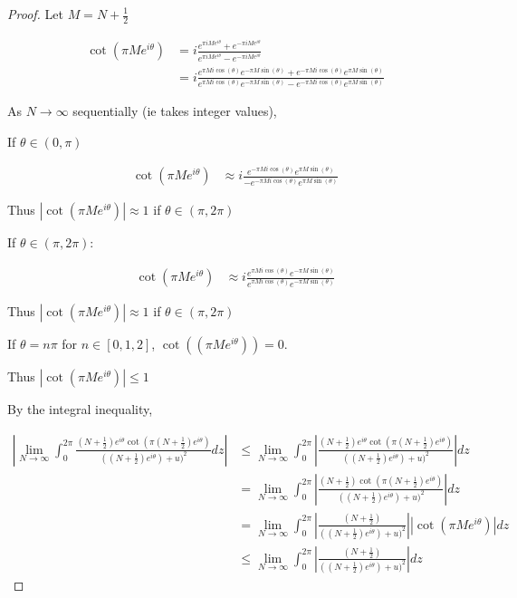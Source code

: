 \documentclass{article}
\newcommand{\abs}[1]{\left\lvert #1\right\rvert}
\begin{document}
\begin{proof}
    Let $M = N + \frac{1}{2}$ 

    \begin{align*}
        \cot\left(\pi Me^{i \theta}\right) &= i \frac{e^{\pi i M e^{i \theta}} + e^{- \pi i M e^{i \theta}}}{e^{\pi i M e^{i \theta}} - e^{- \pi i M e^{i \theta}}} \\
        &= i \frac{e^{\pi M i \cos(\theta)} e^{- \pi M \sin(\theta)} + e^{-\pi Mi \cos(\theta)} e^{\pi M \sin(\theta)}}{e^{\pi M i \cos(\theta)} e^{- \pi M \sin(\theta)} - e^{-\pi Mi \cos(\theta)} e^{\pi M \sin(\theta)}}
    \end{align*} 


    As $N \to \infty$ sequentially (ie takes integer values),
    
    If $\theta \in (0, \pi)$ 
    
    \begin{align*}
        \cot\left(\pi Me^{i \theta}\right) &\approx i \frac{e^{-\pi Mi \cos(\theta)} e^{\pi M \sin(\theta)}}{-e^{-\pi Mi \cos(\theta)} e^{\pi M \sin(\theta)}}
    \end{align*}

    Thus $\abs{\cot\left(\pi Me^{i \theta}\right)} \approx 1$ if $\theta \in (\pi, 2 \pi)$   

    If $\theta \in (\pi, 2 \pi)$:

    \begin{align*}
        \cot\left(\pi Me^{i \theta}\right) &\approx i \frac{e^{\pi Mi \cos(\theta)} e^{-\pi M \sin(\theta)}}{e^{\pi Mi \cos(\theta)} e^{-\pi M \sin(\theta)}}
    \end{align*}

    Thus $\abs{\cot\left(\pi Me^{i \theta}\right)} \approx 1$ if $\theta  \in (\pi, 2 \pi)$ 

    If $\theta = n \pi$ for $n \in [0, 1, 2]$, $\cot\left(\left(\pi Me^{i \theta}\right)\right) = 0$. 
    
    Thus $\abs{\cot\left(\pi Me^{i \theta}\right)} \leq 1$ 

    By the integral inequality,

    \begin{align*}
        \abs{\lim_{N \to \infty}  \int_{0}^{2 \pi} \frac{(N + \frac{1}{2})e^{i \theta} \cot(\pi (N + \frac{1}{2})e^{i \theta})}{((N + \frac{1}{2})e^{i \theta}) + u)^2} dz} 
        &\leq \lim_{N \to \infty} \int_{0}^{2 \pi} \abs{\frac{(N + \frac{1}{2})e^{i \theta} \cot(\pi (N + \frac{1}{2})e^{i \theta})}{((N + \frac{1}{2})e^{i \theta}) + u)^2}} dz \\
        &= \lim_{N \to \infty} \int_{0}^{2 \pi} \abs{\frac{(N + \frac{1}{2}) \cot(\pi (N + \frac{1}{2})e^{i \theta})}{((N + \frac{1}{2})e^{i \theta}) + u)^2}} dz \\
        &= \lim_{N \to \infty} \int_{0}^{2 \pi} \abs{\frac{(N + \frac{1}{2})}{((N + \frac{1}{2})e^{i \theta}) + u)^2}} \abs{\cot\left(\pi Me^{i \theta}\right)} dz \\
        &\leq \lim_{N \to \infty} \int_{0}^{2 \pi} \abs{\frac{(N + \frac{1}{2})}{((N + \frac{1}{2})e^{i \theta}) + u)^2}} dz
    \end{align*}


\end{proof}
\end{document}
